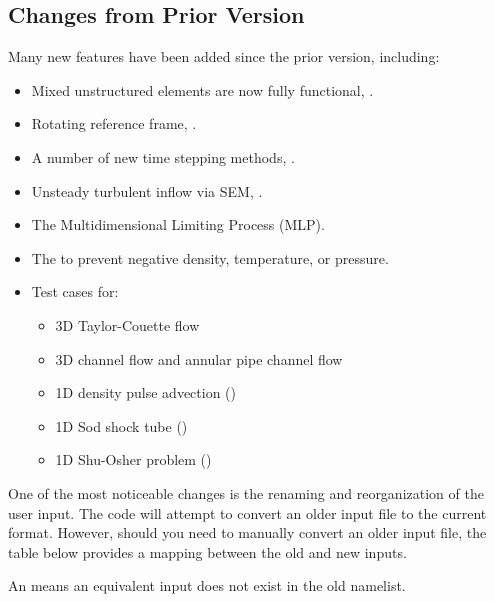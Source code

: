 \subsection{Changes from Prior Version}
\label{SEC:nml_Changes}

Many new features have been added since the prior version, including:
\begin{itemize}
\item
Mixed unstructured elements are now fully functional, .
\item
Rotating reference frame, .
\item
A number of new time stepping methods, .
\item
  Unsteady turbulent inflow via SEM, .
\item
The Multidimensional Limiting Process (MLP).
\item
The 
to prevent negative density, temperature, or pressure.
\item
Test cases for:
\begin{itemize}
\item
3D Taylor-Couette flow
\item
3D channel flow and annular pipe channel flow
\item
1D density pulse advection ()
\item
1D Sod shock tube          ()
\item
1D Shu-Osher problem       ()
\end{itemize}
\end{itemize}


One of the most noticeable changes is the renaming and reorganization of the
user input.
%
The code will attempt to convert an older input file to the current format.
%
However, should you need to manually convert an older input file,
the table below provides a mapping between the old and new inputs.

\noindent\NOTE An \inptext{*} means an equivalent input does not exist in the old namelist.



{%
\newcommand{\myrule}{%
  \rule       {   6pt}{1.0pt}%
  \rule       {   5pt}{1.0ex}%
  \rule[1.0ex]{   6pt}{1.0pt}%
  \rule       {   6pt}{1.0pt}%
  \rule       {   5pt}{1.0ex}%
  \rule[1.0ex]{   6pt}{1.0pt}%
  \rule       {   6pt}{1.0pt}%
  \rule       {2.80in}{1.0ex}%
  \rule[1.0ex]{   6pt}{1.0pt}%
  \rule       {   6pt}{1.0pt}%
  \rule       {   5pt}{1.0ex}%
  \rule[1.0ex]{   6pt}{1.0pt}%
  \rule       {   6pt}{1.0pt}%
  \rule       {2.30in}{1.0ex}%
  \rule[1.0ex]{   6pt}{1.0pt}%
}
}%

